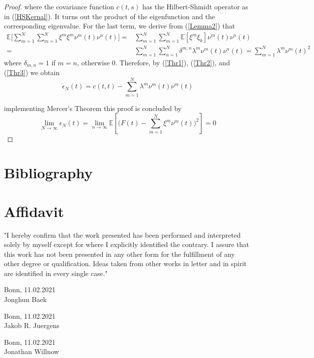 \documentclass[11pt,twoside,a4paper]{article}
\begin{document}
\begin{proof}
		where the covariance function $c(t,s)$ has the Hilbert-Shmidt operator as in (\ref{HSKernal}). It turns out the product of the eigenfunction and the corresponding eigenvalue. For the last term, we derive from (\ref{Lemma2}) that
		\begin{equation}\label{Thr3}
			\begin{split}
				\mathbb{E}\bigg[\sum_{m=1}^{N} \sum_{m=1}^{N} \xi^m \xi^m \nu^m(t) \nu^n(t)\bigg] = & \sum_{m=1}^{N} \sum_{m=1}^{N} \mathbb{E}[\xi^m \xi_{k}] \nu^m(t) \nu^n(t)\\
				= & \sum_{m=1}^{N} \sum_{n=1}^{N} \delta^{m,n} \lambda^m \nu^m(t) \nu^n(t) = 		\sum_{m=1}^{N} \lambda^m \nu^m(t)^{2}
			\end{split}	
		\end{equation}
		where $\delta_{m,n} = 1$ if $m=n$, otherwise 0. Therefore, by (\ref{Thr1}), (\ref{Thr2}), and (\ref{Thr3}) we obtain
		\begin{equation}
			\epsilon_{N}(t) = c(t,t) - \sum_{m=1}^{N} \lambda^m \nu^m(t) \nu^m(t)
		\end{equation}
		
		implementing Mercer's Theorem this proof is concluded by
		\begin{equation}
			\lim\limits_{N \rightarrow \infty} \epsilon_{N}(t) = \lim\limits_{n \rightarrow \infty} \mathbb{E} \left[\bigg( F(t) - \sum_{m=1}^{N} \xi^m \nu^m(t)\bigg)^2 \right] = 0
		\end{equation}
	\end{proof}

	\newpage
	
	\section{Bibliography}
	\printbibliography[heading=none]	
	
	\newpage
	\section{Affidavit}
	
	\vspace{2cm}
	"I hereby confirm that the work presented has been performed and
	interpreted solely by myself except for where I explicitly identified the
	contrary. I assure that this work has not been presented in any other
	form for the fulfillment of any other degree or qualification. Ideas
	taken from other works in letter and in spirit are identified in every
	single case."
	
	\vspace{2cm}
	Bonn, 11.02.2021 \hrulefill \\
	\hspace*{0mm}Jonghun Baek
	
	\vspace{2cm}
	Bonn, 11.02.2021 \hrulefill \\
	\hspace*{0mm}Jakob R. Juergens
	
	\vspace{2cm}
	Bonn, 11.02.2021 \hrulefill \\
	\hspace*{0mm}Jonathan Willnow
	
	
\end{document}
